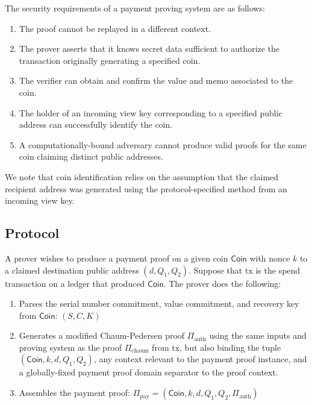 \documentclass{llncs}
\newcommand{\func}[1]{\mathsf{#1}}
\begin{document}
The security requirements of a payment proving system are as follows:
\begin{enumerate}
    \item\label{pay:context} The proof cannot be replayed in a different context.
    \item\label{pay:secret} The prover asserts that it knows secret data sufficient to authorize the transaction originally generating a specified coin.
    \item\label{pay:value_memo} The verifier can obtain and confirm the value and memo associated to the coin.
    \item\label{pay:identify} The holder of an incoming view key corresponding to a specified public address can successfully identify the coin.
    \item\label{pay:malicious} A computationally-bound adversary cannot produce valid proofs for the same coin claiming distinct public addresses.
\end{enumerate}

We note that coin identification relies on the assumption that the claimed recipient address was generated using the protocol-specified method from an incoming view key.


\subsection{Protocol}

A prover wishes to produce a payment proof on a given coin $\func{Coin}$ with nonce $k$ to a claimed destination public address $(d,Q_1,Q_2)$.
Suppose that $\text{tx}$ is the spend transaction on a ledger that produced $\func{Coin}$.
The prover does the following:
\begin{enumerate}
    \item Parses the serial number commitment, value commitment, and recovery key from $\func{Coin}$: $(S,C,K)$
    \item Generates a modified Chaum-Pedersen proof $\Pi_{\text{auth}}$ using the same inputs and proving system as the proof $\Pi_{\text{chaum}}$ from $\text{tx}$, but also binding the tuple $(\func{Coin},k,d,Q_1,Q_2)$, any context relevant to the payment proof instance, and a globally-fixed payment proof domain separator to the proof context.
    \item Assembles the payment proof: $\Pi_{\text{pay}} = (\func{Coin},k,d,Q_1,Q_2,\Pi_{\text{auth}})$
\end{enumerate}
\end{document}
